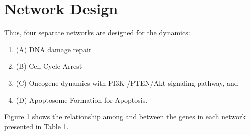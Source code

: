 \section{Network Design}

Thus, four separate networks are designed for the dynamics:
\begin{enumerate}
\item (A) DNA damage repair 
\item (B) Cell Cycle Arrest  
\item (C) Oncogene dynamics  with PI3K /PTEN/Akt signaling pathway,  and 
\item (D) Apoptosome Formation for Apoptosis. 
\end{enumerate}

Figure 1 shows the relationship among and between the genes in each network presented in Table 1.

